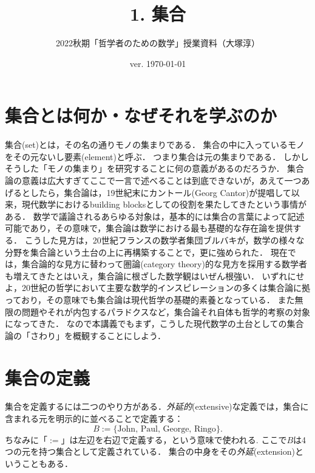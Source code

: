\documentclass[11pt,a4paper]{jsarticle}
\begin{document}
\title{1. 集合}
\author{2022秋期「哲学者のための数学」授業資料（大塚淳）}
\date{ver. \today}
\maketitle



\section{集合とは何か・なぜそれを学ぶのか}

集合(set)とは，その名の通りモノの集まりである．
集合の中に入っているモノをその元ないし要素(element)と呼ぶ．
つまり集合は元の集まりである．
しかしそうした「モノの集まり」を研究することに何の意義があるのだろうか．
集合論の意義は広大すぎてここで一言で述べることは到底できないが，あえて一つあげるとしたら，集合論は，19世紀末にカントール(Georg Cantor)が提唱して以来，現代数学におけるbuilding blocksとしての役割を果たしてきたという事情がある．
数学で議論されるあらゆる対象は，基本的には集合の言葉によって記述可能であり，その意味で，集合論は数学における最も基礎的な存在論を提供する．
こうした見方は，20世紀フランスの数学者集団ブルバキが，数学の様々な分野を集合論という土台の上に再構築することで，更に強められた．
現在では，集合論的な見方に替わって圏論(category theory)的な見方を採用する数学者も増えてきたとはいえ，集合論に根ざした数学観はいぜん根強い．
いずれにせよ，20世紀の哲学において主要な数学的インスピレーションの多くは集合論に拠っており，その意味でも集合論は現代哲学の基礎的素養となっている．
また無限の問題やそれが内包するパラドクスなど，集合論それ自体も哲学的考察の対象になってきた．
なので本講義でもまず，こうした現代数学の土台としての集合論の「さわり」を概観することにしよう．




\section{集合の定義}

集合を定義するには二つのやり方がある．\emph{外延的}(extensive)な定義では，集合に含まれる元を明示的に並べることで定義する：
\[
 B := \{\text{John, Paul, George, Ringo}\}.
\]
ちなみに「$:=$」は左辺を右辺で定義する，という意味で使われる.
ここで$B$は4つの元を持つ集合として定義されている．
集合の中身をその\emph{外延}(extension)ということもある．
\end{document}
